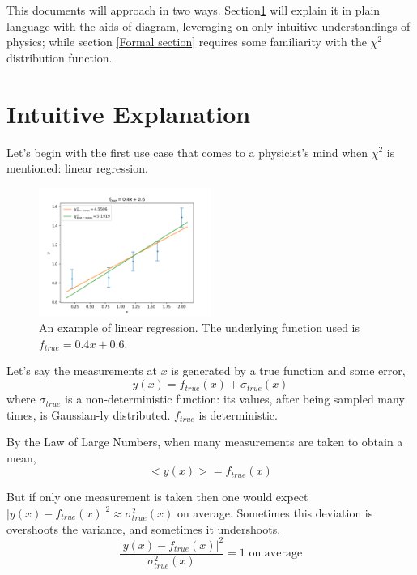\documentclass[a4paper, 12pt]{article}
\begin{document}
This documents will approach in two ways. Section\ref{Intuitive section} will explain it in plain language with the aids of diagram, leveraging on only intuitive understandings of physics; while section \ref{Formal section} requires some familiarity with the $\chi^2$ distribution function.

\section{Intuitive Explanation}\label{Intuitive section}

Let's begin with the first use case that comes to a physicist's mind when $\chi^2$ is mentioned: linear regression.
\begin{figure}[H]
\centering
\includegraphics[width=0.5\textwidth]{A_linregress.png}
\caption{An example of linear regression. The underlying function used is $f_{true}=0.4x+0.6$.
}\label{A_linregress}
\end{figure}

Let's say the measurements at $x$ is generated by a true function and some error,
\begin{equation}
    y(x) = f_{true}(x) + \sigma_{true}(x)
\end{equation}
where $\sigma_{true}$ is a non-deterministic function: its values, after being sampled many times, is Gaussian-ly distributed. $f_{true}$ is deterministic.

By the Law of Large Numbers, when many measurements are taken to obtain a mean, 
\begin{equation}
    <y(x)> = f_{true}(x)
\end{equation}

But if only one measurement is taken then one would expect $|y(x)-f_{true}(x)|^2 \approx \sigma^2_{true}(x)$ on average. Sometimes this deviation is overshoots the variance, and sometimes it undershoots.
\begin{equation}\label{on average equal 1 equation}
    \frac{|y(x)-f_{true}(x)|^2}{\sigma^2_{true}(x)}=1 \text{  on average}
\end{equation}
\end{document}
